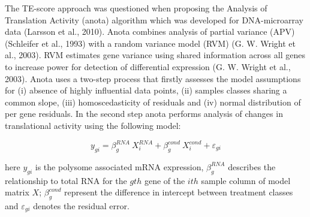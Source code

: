 \documentclass[12pt,openany]{book}
\begin{document}
The TE-score approach was questioned when proposing the Analysis of
Translation Activity (anota) algorithm which was developed for
DNA-microarray data (Larsson et al., 2010). Anota combines analysis of
partial variance (APV) (Schleifer et al., 1993) with a random variance
model (RVM) (G. W. Wright et al., 2003). RVM estimates gene variance
using shared information across all genes to increase power for
detection of differential expression (G. W. Wright et al., 2003). Anota
uses a two-step process that firstly assesses the model assumptions for
(i) absence of highly influential data points, (ii) samples classes
sharing a common slope, (iii) homoscedasticity of residuals and (iv)
normal distribution of per gene residuals. In the second step anota
performs analysis of changes in translational activity using the
following model:

\[y_{gi} = \beta_g^{RNA}\ X_i^{RNA}+ \beta_g^{cond}\ X_i^{cond} + \varepsilon_{gi}\]

here \(y_{gi}\) is the polysome associated mRNA expression,
\(\beta_g^{RNA}\) describes the relationship to total RNA for the
\(gth\) gene of the \(ith\) sample column of model matrix \(X\);
\(\beta_g^{cond}\) represent the difference in intercept between
treatment classes and \(\varepsilon_{gi}\) denotes the residual error.
\clearpage
\end{document}
